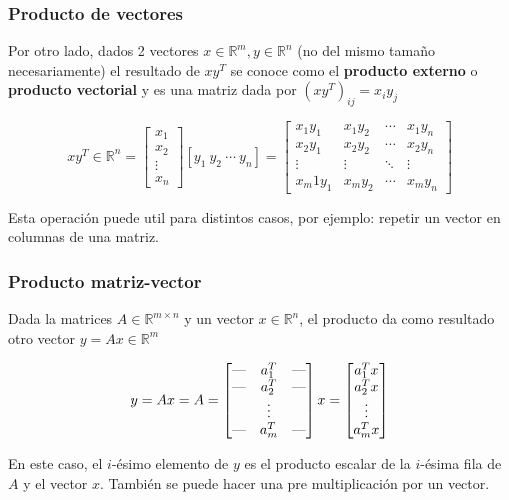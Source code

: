 \documentclass[10pt]{beamer}
\begin{document}
\begin{frame}
    \frametitle{Producto de vectores}
    Por otro lado, dados 2 vectores $x \in \mathbb{R}^m, y \in \mathbb{R}^n$ (no del mismo tamaño necesariamente)
    el resultado de $xy^T$ se conoce como el \textbf{producto externo} o \textbf{producto vectorial} y 
    es una matriz dada por $(xy^T)_{ij} = x_iy_j$

    \begin{equation}
        xy^T \in \mathbb{R}^n = \begin{bmatrix}
            x_1\\
            x_2\\
            \vdots \\
            x_n
        \end{bmatrix} [y_1 \ y_2 \ \cdots \ y_n]= \begin{bmatrix}
            x_1y_1 & x_1y_2 & \cdots & x_1y_n \\
            x_2y_1 & x_2y_2 & \cdots & x_2y_n \\
            \vdots & \vdots & \ddots & \vdots \\
            x_m1y_1 & x_my_2 & \cdots & x_my_n
        \end{bmatrix}
    \end{equation}

    Esta operación puede util para distintos casos, por ejemplo: repetir un vector en columnas de una matriz.
\end{frame}

\begin{frame}
    \frametitle{Producto matriz-vector}
    Dada la matrices $A \in \mathbb{R}^{m\times n}$ y un vector $x \in \mathbb{R}^n$, el producto da 
    como resultado otro vector $y = Ax \in \mathbb{R}^m$

    \begin{equation}
        y = Ax = A = \begin{bmatrix}
            \text{\textemdash} & a_1^T & \text{\textemdash} \\
            \text{\textemdash} & a_2^T & \text{\textemdash} \\
                  & \vdots &  \\
            \text{\textemdash} & a_m^T & \text{\textemdash} \\
            \end{bmatrix} x = \begin{bmatrix}
             a_1^Tx \\
             a_2^Tx \\
             \vdots \\
             a_m^Tx
        \end{bmatrix}
    \end{equation}

    En este caso, el $i$-ésimo elemento de $y$ es el producto escalar de la $i$-ésima fila de $A$ 
    y el vector $x$. También se puede hacer una pre multiplicación por un vector.
\end{frame}
\end{document}
